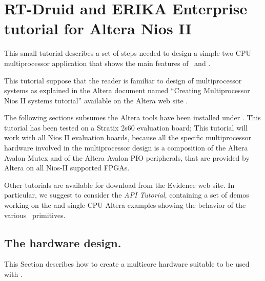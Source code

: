 \chapter{RT-Druid and ERIKA Enterprise tutorial for Altera Nios II}

This small tutorial describes a set of steps needed to design a simple
two CPU multiprocessor application that shows the main features of
\ee\ and \rtd.

This tutorial suppose that the reader is familiar to design of
multiprocessor systems as explained in the Altera document named
{}``Creating Multiprocessor Nios II systems tutorial'' available on
the Altera web site \cite{Altera-multicpu-tutorial}.

The following sections subsumes the Altera tools have been installed
under . This tutorial has been tested on a Stratix
2s60 evaluation board; This tutorial will work with all Nios II
evaluation boards, because all the specific multiprocessor hardware
involved in the multiprocessor design is a composition of the Altera
Avalon Mutex and of the Altera Avalon PIO peripherals, that are
provided by Altera on all Nios-II supported FPGAs.

Other tutorials are available for download from the Evidence web
site. In particular, we suggest to consider the {\em API Tutorial},
containing a set of demos working on the
 and  single-CPU Altera examples
showing the behavior of the various \ee\ primitives.


\section{The hardware design.}

This Section describes how to create a multicore hardware suitable to
be used with \ee.



